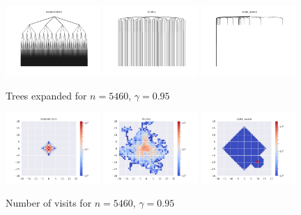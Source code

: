 \documentclass[runningheads]{llncs}
\begin{document}
\begin{figure}[H]
    \centering
    \includegraphics[width=0.32\textwidth]{img/4_deterministic.pdf}
    \includegraphics[width=0.32\textwidth]{img/4_kl-olop.pdf}
    \includegraphics[width=0.32\textwidth]{img/4_state_aware.pdf}
    \caption{Trees expanded for $n = 5460$, $\gamma=0.95$}
    \label{fig:gw4_trees}
\end{figure}
\begin{figure}[H]
    \centering
    \includegraphics[width=0.32\textwidth]{img/4_occupations_deterministic.pdf}
    \includegraphics[width=0.32\textwidth]{img/4_occupations_kl-olop.pdf}
    \includegraphics[width=0.32\textwidth]{img/4_occupations_state_aware.pdf}
    \caption{Number of visits for $n = 5460$, $\gamma=0.95$}
    \label{fig:gw4_visits}
\end{figure}
\end{document}
